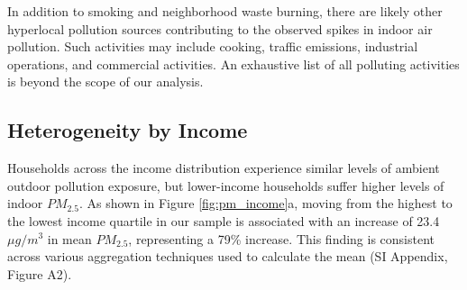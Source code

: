 \documentclass[9pt,twocolumn,twoside]{pnas-new}
\begin{document}
In addition to smoking and neighborhood waste burning, there are likely other hyperlocal pollution sources contributing to the observed spikes in indoor air pollution. Such activities may include cooking, traffic emissions, industrial operations, and commercial activities. An exhaustive list of all polluting activities is beyond the scope of our analysis.



\subsection{Heterogeneity by Income}

Households across the income distribution experience similar levels of ambient outdoor pollution exposure, but lower-income households suffer higher levels of indoor $PM_{2.5}$. As shown in Figure \ref{fig:pm_income}a, moving from the highest to the lowest income quartile in our sample is associated with an increase of 23.4 $\mu g/m^3$ in mean $PM_{2.5}$, representing a 79\% increase. This finding is consistent across various aggregation techniques used to calculate the mean (SI Appendix, Figure A2).
\end{document}
